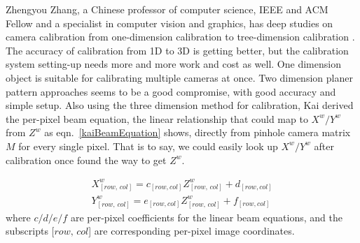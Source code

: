 
Zhengyou Zhang, a Chinese professor of computer science, IEEE and ACM Fellow and a specialist in computer vision and graphics, has deep studies on camera calibration from one-dimension calibration to tree-dimension calibration \cite{zhangCalibration1_2004} \cite{zhangCalibration2_2000} \cite{Zhengyou04}. The accuracy of calibration from 1D to 3D is getting better, but the calibration system setting-up needs more and more work and cost as well. One dimension object is suitable for calibrating multiple cameras at once. Two dimension planer pattern approaches seems to be a good compromise, with good accuracy and simple setup. Also using the three dimension method for calibration, Kai \cite{Kai10} derived the per-pixel  beam equation, the linear relationship that could map to \(X^w/Y^w\) from \(Z^w\) as eqn.~\ref{kaiBeamEquation} shows, directly from pinhole camera matrix \(M\) for every single pixel. That is to say, we could easily look up \(X^w/Y^w\) after calibration once found the way to get \(Z^w\).

\begin{equation}
\begin{aligned}
X^w_{[row, \, col]} = c_{[row, col]}Z^w_{[row, \, col]}+d_{[row, col]}
\\%
Y^w_{[row, \, col]} = e_{[row, col]}Z^w_{[row, \, col]}+f_{[row, col]}
\end{aligned}
\label{kaiBeamEquation}
\end{equation}%
\noindent
where \(c/d/e/f\) are per-pixel coefficients for the linear beam equations, and the subscripts [\(row, \, col\)] are corresponding per-pixel image coordinates.



